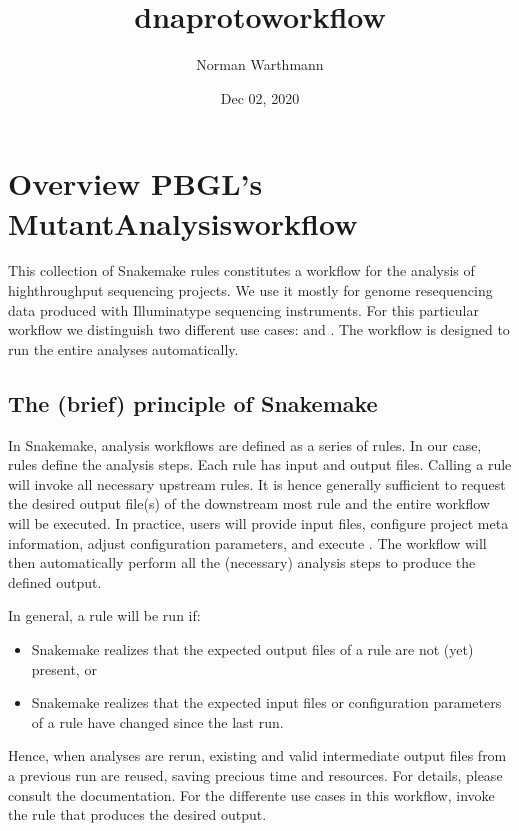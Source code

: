 \documentclass[letterpaper,10pt,english]{sphinxmanual}
\title{dna\sphinxhyphen{}proto\sphinxhyphen{}workflow}
\date{Dec 02, 2020}
\author{Norman Warthmann}
\begin{document}
\pagestyle{empty}
\sphinxmaketitle
\pagestyle{plain}
\sphinxtableofcontents
\pagestyle{normal}
\label{\detokenize{index::doc}}



\chapter{Overview PBGL’s Mutant\sphinxhyphen{}Analysis\sphinxhyphen{}workflow}
\label{\detokenize{index:overview-pbgl-s-mutant-analysis-workflow}}
This collection of Snakemake rules constitutes a workflow for the analysis of high\sphinxhyphen{}throughput sequencing projects. We use it mostly for genome re\sphinxhyphen{}sequencing data produced with Illumina\sphinxhyphen{}type sequencing instruments.
For this particular workflow we distinguish two different use cases:  and . The workflow is designed to run the entire analyses automatically.


\section{The (brief) principle of Snakemake}
\label{\detokenize{index:the-brief-principle-of-snakemake}}
In Snakemake, analysis workflows are defined as a series of rules. In our case, rules define the analysis steps. Each rule has input and output files. Calling a rule will invoke all necessary upstream rules. It is hence generally sufficient to request the desired output file(s) of the downstream most rule and the entire workflow will be executed.
In practice, users will provide input files, configure project meta information, adjust configuration parameters, and execute . The workflow will then automatically perform all the (necessary) analysis steps to produce the defined output.

In general, a rule will be run if:
\begin{itemize}
\item {} 
Snakemake realizes that the expected output files of a rule are not (yet) present, or

\item {} 
Snakemake realizes that the expected input files or configuration parameters of a rule have changed since the last run.

\end{itemize}

Hence, when analyses are re\sphinxhyphen{}run, existing and valid intermediate output files from a previous run are re\sphinxhyphen{}used, saving precious time and resources.
For details, please consult the  documentation. For the differente use cases in this workflow, invoke the rule that produces the desired output.
\end{document}
